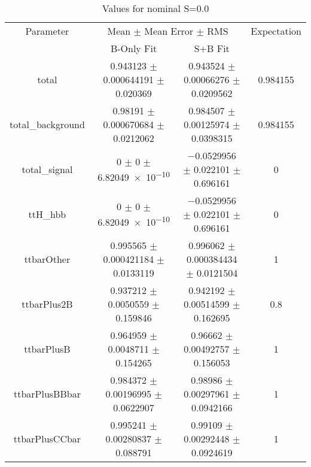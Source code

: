 \begin{table}
\centering
\caption{Values for nominal S=0.0}
\begin{tabular}{cccc}
\toprule
Parameter & \multicolumn{2}{c}{Mean $\pm$ Mean Error $\pm$ RMS} & Expectation\\
 & B-Only Fit & S+B Fit & \\
\midrule
total & \num{0.943123} $\pm$ \num{0.000644191} $\pm$ \num{0.020369} & \num{0.943524} $\pm$ \num{0.00066276} $\pm$ \num{0.0209562} & \num{0.984155}\\
total\_background & \num{0.98191} $\pm$ \num{0.000670684} $\pm$ \num{0.0212062} & \num{0.984507} $\pm$ \num{0.00125974} $\pm$ \num{0.0398315} & \num{0.984155}\\
total\_signal & \num{0} $\pm$ \num{0} $\pm$ \num{6.82049e-10} & \num{-0.0529956} $\pm$ \num{0.022101} $\pm$ \num{0.696161} & \num{0}\\
ttH\_hbb & \num{0} $\pm$ \num{0} $\pm$ \num{6.82049e-10} & \num{-0.0529956} $\pm$ \num{0.022101} $\pm$ \num{0.696161} & \num{0}\\
ttbarOther & \num{0.995565} $\pm$ \num{0.000421184} $\pm$ \num{0.0133119} & \num{0.996062} $\pm$ \num{0.000384434} $\pm$ \num{0.0121504} & \num{1}\\
ttbarPlus2B & \num{0.937212} $\pm$ \num{0.0050559} $\pm$ \num{0.159846} & \num{0.942192} $\pm$ \num{0.00514599} $\pm$ \num{0.162695} & \num{0.8}\\
ttbarPlusB & \num{0.964959} $\pm$ \num{0.0048711} $\pm$ \num{0.154265} & \num{0.96662} $\pm$ \num{0.00492757} $\pm$ \num{0.156053} & \num{1}\\
ttbarPlusBBbar & \num{0.984372} $\pm$ \num{0.00196995} $\pm$ \num{0.0622907} & \num{0.98986} $\pm$ \num{0.00297961} $\pm$ \num{0.0942166} & \num{1}\\
ttbarPlusCCbar & \num{0.995241} $\pm$ \num{0.00280837} $\pm$ \num{0.088791} & \num{0.99109} $\pm$ \num{0.00292448} $\pm$ \num{0.0924619} & \num{1}\\
\bottomrule
\end{tabular}
\end{table}